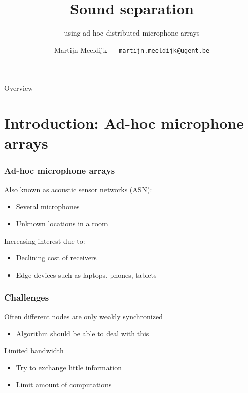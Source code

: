 \documentclass[aspectratio=169]{beamer}
\title{Sound separation }
\subtitle{using ad-hoc distributed microphone arrays}
\date[ISBT 2022]{}
\author[MM]{Martijn Meeldijk --- \texttt{martijn.meeldijk@ugent.be}}
\begin{document}
\logoframe

\titleframe

\begin{frame}{Overview}
    \tableofcontents[hideallsubsections]
\end{frame}

\section{Introduction: Ad-hoc microphone arrays}

\begin{frame}
    \frametitle{Ad-hoc microphone arrays}
    Also known as acoustic sensor networks (ASN):
    \begin{itemize}
        \item Several microphones
        \item Unknown locations in a room
    \end{itemize}
    \vspace{.25cm}
    Increasing interest due to:
    \begin{itemize}
        \item Declining cost of receivers
        \item Edge devices such as laptops, phones, tablets
           
    \end{itemize}
\end{frame}

\begin{frame}
    \frametitle{Challenges}
    Often different nodes are only weakly synchronized
    \begin{itemize}
        \item Algorithm should be able to deal with this
    \end{itemize}
    \vspace{.25cm}
    Limited bandwidth
    \begin{itemize}
        \item Try to exchange little information
        \item Limit amount of computations
           
    \end{itemize}
\end{frame}
\end{document}
